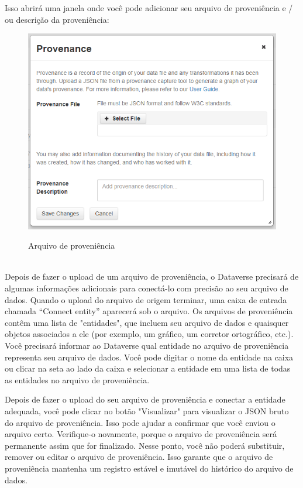 \documentclass[12pt,hidelinks]{article}
\begin{document}
Isso abrirá uma janela onde você pode adicionar seu arquivo de proveniência e / ou descrição da proveniência:
    
 \begin{figure}[H]
                 \caption{Arquivo de proveniência}
                \centering                \includegraphics[scale=0.7]{imagens/prov1.png}
            \label{Proveniência1}
        \end{figure}
\\

Depois de fazer o upload de um arquivo de proveniência, o Dataverse precisará de algumas informações adicionais para conectá-lo com precisão ao seu arquivo de dados. Quando o upload do arquivo de origem terminar, uma caixa de entrada chamada “Connect entity” aparecerá sob o arquivo. Os arquivos de proveniência contêm uma lista de "entidades", que incluem seu arquivo de dados e quaisquer objetos associados a ele (por exemplo, um gráfico, um corretor ortográfico, etc.). Você precisará informar ao Dataverse qual entidade no arquivo de proveniência representa seu arquivo de dados. Você pode digitar o nome da entidade na caixa ou clicar na seta ao lado da caixa e selecionar a entidade em uma lista de todas as entidades no arquivo de proveniência.

Depois de fazer o upload do seu arquivo de proveniência e conectar a entidade adequada, você pode clicar no botão "Visualizar" para visualizar o JSON bruto do arquivo de proveniência. Isso pode ajudar a confirmar que você enviou o arquivo certo. Verifique-o novamente, porque o arquivo de proveniência será permanente assim que for finalizado. Nesse ponto, você não poderá substituir, remover ou editar o arquivo de proveniência. Isso garante que o arquivo de proveniência mantenha um registro estável e imutável do histórico do arquivo de dados. 
\end{document}
